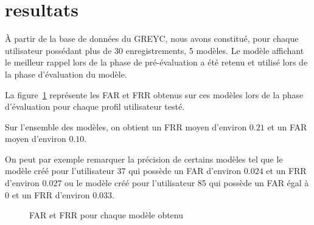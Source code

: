 \section{resultats}

À partir de la base de données du GREYC, nous avons constitué, pour chaque utilisateur possédant plus de 30 enregistrements, 5 modèles. Le modèle affichant le meilleur rappel lors de la phase de pré-évaluation a été retenu et utilisé lors de la phase d'évaluation du modèle.

La figure~\ref{results} représente les FAR et FRR obtenus sur ces modèles lors de la phase d'évaluation pour chaque profil utilisateur testé.

Sur l'ensemble des modèles, on obtient un FRR moyen d'environ $0.21$ et un FAR moyen d'environ $0.10$.

On peut par exemple remarquer la précision de certains modèles tel que le modèle créé pour l'utilisateur 37 qui possède un FAR d'environ $0.024$ et un FRR d'environ $0.027$ ou le modèle créé pour l'utilisateur 85 qui possède un FAR égal à $0$ et un FRR d'environ $0.033$.


\loadedtable

\begin{figure}
\caption{FAR et FRR pour chaque modèle obtenu}
\label{results}
\end{figure}